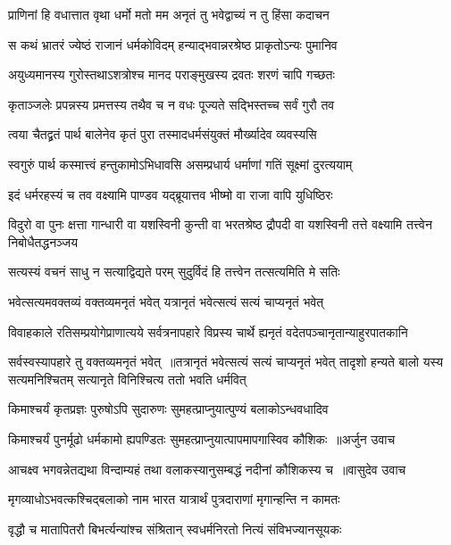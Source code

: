 \twolineshloka
{प्राणिनां हि वधात्तात वृथा धर्मो मतो मम}
{अनृतं तु भवेद्वाच्यं न तु हिंसा कदाचन}


\twolineshloka
{स कथं भ्रातरं ज्येष्ठं राजानं धर्मकोविदम्}
{हन्याद्भवान्नरश्रेष्ठ प्राकृतोऽन्यः पुमानिव}


\twolineshloka
{अयुध्यमानस्य गुरोस्तथाऽशत्रोश्च मानद}
{पराङ्मुखस्य द्रवतः शरणं चापि गच्छतः}


\twolineshloka
{कृताञ्जलेः प्रपन्नस्य प्रमत्तस्य तथैव च}
{न वधः पूज्यते सद्भिस्तच्च सर्वं गुरौ तव}


\twolineshloka
{त्वया चैतद्व्रतं पार्थ बालेनेव कृतं पुरा}
{तस्मादधर्मसंयुक्तं मौर्ख्यादेव व्यवस्यसि}


\twolineshloka
{स्वगुरुं पार्थ कस्मात्त्वं हन्तुकामोऽभिधावसि}
{असम्प्रधार्य धर्माणां गतिं सूक्ष्मां दुरत्ययाम्}


\twolineshloka
{इदं धर्मरहस्यं च तव वक्ष्यामि पाण्डव}
{यद्ब्रूयात्तव भीष्मो वा राजा वापि युधिष्ठिरः}


\threelineshloka
{विदुरो वा पुनः क्षत्ता गान्धारी वा यशस्विनी}
{कुन्ती वा भरतश्रेष्ठ द्रौपदी वा यशस्विनी}
{तत्ते वक्ष्यामि तत्त्वेन निबोधैतद्धनञ्जय}


\twolineshloka
{सत्यस्यं वचनं साधु न सत्याद्विद्यते परम्}
{सुदुर्विदं हि तत्त्वेन तत्सत्यमिति मे सतिः}


\twolineshloka
{भवेत्सत्यमवक्तव्यं वक्तव्यमनृतं भवेत्}
{यत्रानृतं भवेत्सत्यं सत्यं चाप्यनृतं भवेत्}


\twolineshloka
{विवाहकाले रतिसम्प्रयोगेप्राणात्यये सर्वत्रनापहारे}
{विप्रस्य चार्थे ह्यनृतं वदेतपञ्चानृतान्याहुरपातकानि}


सर्वस्वस्यापहारे तु वक्तव्यमनृतं भवेत् ॥तत्रानृतं भवेत्सत्यं सत्यं चाप्यनृतं भवेत्
\twolineshloka
{तादृशो हन्यते बालो यस्य सत्यमनिश्चितम्}
{सत्यानृते विनिश्चित्य ततो भवति धर्मवित्}


\twolineshloka
{किमाश्चर्यं कृतप्रज्ञः पुरुषोऽपि सुदारुणः}
{सुमहत्प्राप्नुयात्पुण्यं बलाकोऽन्धवधादिव}


\threelineshloka
{किमाश्चर्यं पुनर्मूढो धर्मकामो ह्यपण्डितः}
{सुमहत्प्राप्नुयात्पापमापगास्विव कौशिकः ॥अर्जुन उवाच}
{}


\threelineshloka
{आचक्ष्व भगवन्नेतद्यथा विन्दाम्यहं तथा}
{वलाकस्यानुसम्बद्धं नदीनां कौशिकस्य च ॥वासुदेव उवाच}
{}


\twolineshloka
{मृगव्याधोऽभवत्कश्चिद्बलाको नाम भारत}
{यात्रार्थं पुत्रदाराणां मृगान्हन्ति न कामतः}


\twolineshloka
{वृद्धौ च मातापितरौ बिभर्त्यन्यांश्च संश्रितान्}
{स्वधर्मनिरतो नित्यं संविभज्यानसूयकः}


